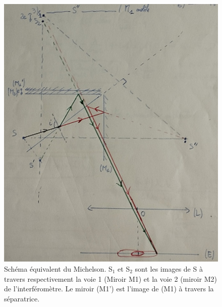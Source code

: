  \begin{figure}[!htbp]
  \centering
  \includegraphics[scale=0.4]{LPO3/Michelson.jpg}
  \caption{\label{fig:Michelson}Schéma équivalent du Michelson. S$_1$ et S$_2$ sont les images de S à travers respectivement la voie 1 (Miroir M1) et la voie 2 (miroir M2) de l'interféromètre. Le miroir (M1') est l'image de (M1) à travers la séparatrice.}
  \end{figure}
  \clearpage
  
  

